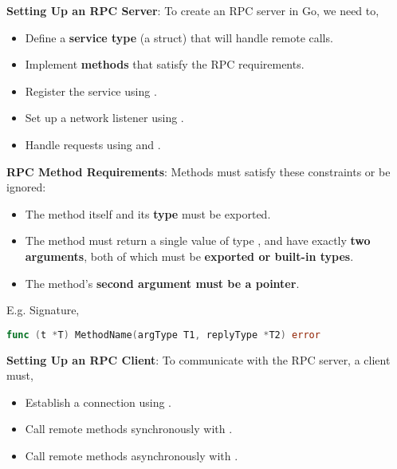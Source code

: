     \begin{Def}
    
    \noindent
    \textbf{Setting Up an RPC Server}:
    To create an RPC server in Go, we need to,
    \begin{itemize}
        \item Define a \textbf{service type} (a struct) that will handle remote calls.
        \item Implement \textbf{methods} that satisfy the RPC requirements.
        \item Register the service using .
        \item Set up a network listener using .
        \item Handle requests using  and .
    \end{itemize}
    
    \noindent
    \textbf{RPC Method Requirements}:
    Methods must satisfy these constraints or be ignored:
    \begin{itemize}
        \item The method itself and its \textbf{type} must be exported.
        \item The method must return a single value of type , and have exactly \textbf{two arguments}, both of which must be \textbf{exported or built-in types}.
        \item The method's \textbf{second argument must be a pointer}.
    \end{itemize}
    
    \noindent
    E.g. Signature,
    
    \begin{lstlisting}[language=Go, numbers=none]
    func (t *T) MethodName(argType T1, replyType *T2) error
    \end{lstlisting}
    
    \noindent
    \textbf{Setting Up an RPC Client}:
    To communicate with the RPC server, a client must,
    \begin{itemize}
        \item Establish a connection using .
        \item Call remote methods synchronously with .
        \item Call remote methods asynchronously with .
    \end{itemize}
    \end{Def}

